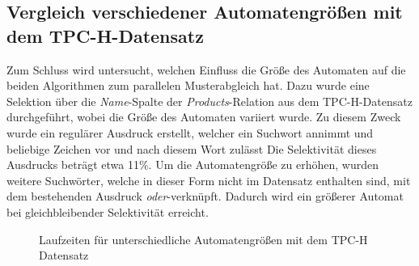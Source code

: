 \subsection{Vergleich verschiedener Automatengrößen mit dem TPC-H-Datensatz}
\label{sec:regex_evaluation_beobachtung_5}

Zum Schluss wird untersucht, welchen Einfluss die Größe des Automaten auf die beiden Algorithmen zum parallelen Musterabgleich hat.
Dazu wurde eine Selektion über die \emph{Name}-Spalte der \emph{Products}-Relation aus dem TPC-H-Datensatz durchgeführt, wobei die Größe des Automaten variiert wurde.
Zu diesem Zweck wurde ein regulärer Ausdruck erstellt, welcher ein Suchwort annimmt und beliebige Zeichen vor und nach diesem Wort zulässt
Die Selektivität dieses Ausdrucks beträgt etwa 11\%.
Um die Automatengröße zu erhöhen, wurden weitere Suchwörter, welche in dieser Form nicht im Datensatz enthalten sind, mit dem bestehenden Ausdruck \emph{oder}-verknüpft.
Dadurch wird ein größerer Automat bei gleichbleibender Selektivität erreicht.


\begin{figure}[]
	\centering
	\caption{Laufzeiten für unterschiedliche Automatengrößen mit dem TPC-H Datensatz}
	\label{fig:regex_p_name}
\end{figure}

